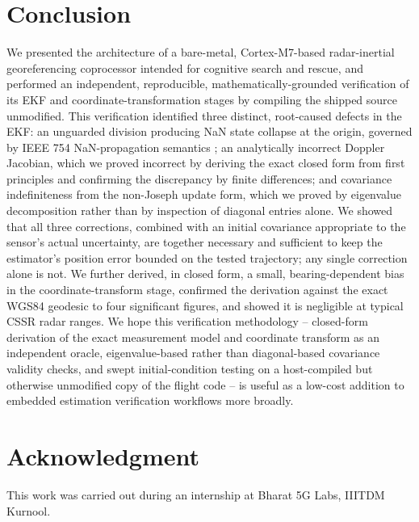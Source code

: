\documentclass[conference]{IEEEtran}
\begin{document}
\section{Conclusion}

We presented the architecture of a bare-metal, Cortex-M7-based radar-inertial georeferencing coprocessor intended for cognitive search and rescue, and performed an independent, reproducible, mathematically-grounded verification of its EKF and coordinate-transformation stages by compiling the shipped source unmodified. This verification identified three distinct, root-caused defects in the EKF: an unguarded division producing NaN state collapse at the origin, governed by IEEE 754 NaN-propagation semantics \cite{r16}; an analytically incorrect Doppler Jacobian, which we proved incorrect by deriving the exact closed form from first principles and confirming the discrepancy by finite differences; and covariance indefiniteness from the non-Joseph update form, which we proved by eigenvalue decomposition rather than by inspection of diagonal entries alone. We showed that all three corrections, combined with an initial covariance appropriate to the sensor's actual uncertainty, are together necessary and sufficient to keep the estimator's position error bounded on the tested trajectory; any single correction alone is not. We further derived, in closed form, a small, bearing-dependent bias in the coordinate-transform stage, confirmed the derivation against the exact WGS84 geodesic to four significant figures, and showed it is negligible at typical CSSR radar ranges. We hope this verification methodology -- closed-form derivation of the exact measurement model and coordinate transform as an independent oracle, eigenvalue-based rather than diagonal-based covariance validity checks, and swept initial-condition testing on a host-compiled but otherwise unmodified copy of the flight code -- is useful as a low-cost addition to embedded estimation verification workflows more broadly.

\section*{Acknowledgment}
This work was carried out during an internship at Bharat 5G Labs, IIITDM Kurnool.
\end{document}
